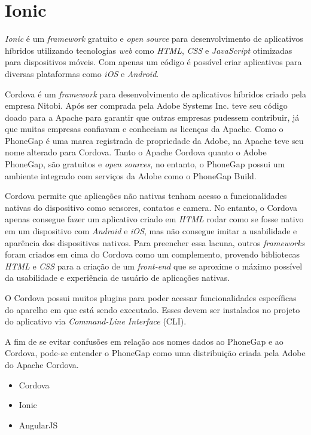 \section{Ionic}

\textit{Ionic} é um \textit{framework} gratuito e \textit{open source} para desenvolvimento de aplicativos híbridos utilizando tecnologias 
\textit{web} como \textit{HTML}, \textit{CSS} e \textit{JavaScript} otimizadas para dispositivos móveis. Com apenas um código é possível criar aplicativos para diversas plataformas como
\textit{iOS} e \textit{Android}. %

Cordova é um \textit{framework} para desenvolvimento de aplicativos híbridos criado pela empresa Nitobi. 
Após ser comprada pela Adobe Systems Inc. teve seu código doado para a Apache para garantir que outras empresas pudessem contribuir, já que muitas empresas confiavam e conheciam as licenças da Apache.
Como o PhoneGap é uma marca registrada de propriedade da Adobe, na Apache teve seu nome alterado para Cordova.
Tanto o Apache Cordova quanto o Adobe PhoneGap, são gratuitos e \textit{open sources}, no entanto, o PhoneGap possui um ambiente integrado com serviços da Adobe como o PhoneGap Build.

Cordova permite que aplicações não nativas tenham acesso a funcionalidades nativas do dispositivo como sensores, 
contatos e camera. No entanto, o Cordova apenas consegue fazer um aplicativo criado em 
\textit{HTML} rodar como se fosse nativo em um dispositivo com \textit{Android} e \textit{iOS}, mas não consegue 
imitar a usabilidade e aparência dos dispositivos nativos. 
Para preencher essa lacuna, outros \textit{frameworks} foram criados em cima do Cordova como um complemento, provendo bibliotecas \textit{HTML} e \textit{CSS} para a 
criação de um \textit{front-end} que se aproxime o máximo possível da usabilidade e experiência de usuário de aplicações nativas.

O Cordova possui muitos plugins para poder acessar funcionalidades específicas do aparelho em que está sendo executado. Esses devem ser instalados no projeto do aplicativo via \textit{Command-Line Interface} (CLI). 

A fim de se evitar confusões em relação aos nomes dados ao PhoneGap e ao Cordova, pode-se entender o PhoneGap como uma distribuição criada pela Adobe do Apache Cordova. 


\begin{itemize}

    \item Cordova
	
    \item Ionic
    
    \item AngularJS

\end{itemize}